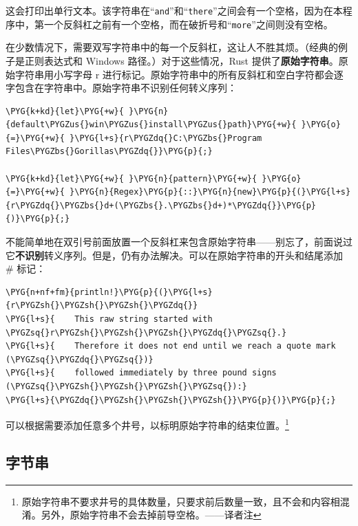 这会打印出单行文本。该字符串在“\texttt{and}”和“\texttt{there}”之间会有一个空格，因为在本程序中，第一个反斜杠之前有一个空格，而在破折号和“\texttt{more}”之间则没有空格。

在少数情况下，需要双写字符串中的每一个反斜杠，这让人不胜其烦。（经典的例子是正则表达式和 Windows 路径。）对于这些情况，Rust 提供了\textbf{原始字符串}。原始字符串用小写字母 r 进行标记。原始字符串中的所有反斜杠和空白字符都会逐字包含在字符串中。原始字符串不识别任何转义序列：

\begin{Verbatim}[commandchars=\\\{\},breaklines=true,breakanywhere=true,fontsize=\codefont,xleftmargin=17bp]
\PYG{k+kd}{let}\PYG{+w}{ }\PYG{n}{default\PYGZus{}win\PYGZus{}install\PYGZus{}path}\PYG{+w}{ }\PYG{o}{=}\PYG{+w}{ }\PYG{l+s}{r\PYGZdq{}C:\PYGZbs{}Program Files\PYGZbs{}Gorillas\PYGZdq{}}\PYG{p}{;}

\PYG{k+kd}{let}\PYG{+w}{ }\PYG{n}{pattern}\PYG{+w}{ }\PYG{o}{=}\PYG{+w}{ }\PYG{n}{Regex}\PYG{p}{::}\PYG{n}{new}\PYG{p}{(}\PYG{l+s}{r\PYGZdq{}\PYGZbs{}d+(\PYGZbs{}.\PYGZbs{}d+)*\PYGZdq{}}\PYG{p}{)}\PYG{p}{;}
\end{Verbatim}

不能简单地在双引号前面放置一个反斜杠来包含原始字符串——别忘了，前面说过它\textbf{不识别}转义序列。但是，仍有办法解决。可以在原始字符串的开头和结尾添加 \# 标记：

\begin{Verbatim}[commandchars=\\\{\},breaklines=true,breakanywhere=true,fontsize=\codefont,xleftmargin=17bp]
\PYG{n+nf+fm}{println!}\PYG{p}{(}\PYG{l+s}{r\PYGZsh{}\PYGZsh{}\PYGZsh{}\PYGZdq{}}
\PYG{l+s}{    This raw string started with \PYGZsq{}r\PYGZsh{}\PYGZsh{}\PYGZsh{}\PYGZdq{}\PYGZsq{}.}
\PYG{l+s}{    Therefore it does not end until we reach a quote mark (\PYGZsq{}\PYGZdq{}\PYGZsq{})}
\PYG{l+s}{    followed immediately by three pound signs (\PYGZsq{}\PYGZsh{}\PYGZsh{}\PYGZsh{}\PYGZsq{}):}
\PYG{l+s}{\PYGZdq{}\PYGZsh{}\PYGZsh{}\PYGZsh{}}\PYG{p}{)}\PYG{p}{;}
\end{Verbatim}

可以根据需要添加任意多个井号，以标明原始字符串的结束位置。\footnote{原始字符串不要求井号的具体数量，只要求前后数量一致，且不会和内容相混淆。另外，原始字符串不会去掉前导空格。——译者注}

\subsection{字节串}

